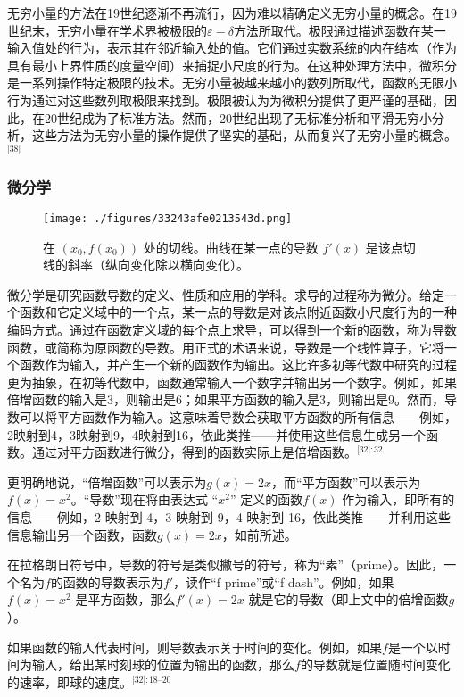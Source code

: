 无穷小量的方法在19世纪逐渐不再流行，因为难以精确定义无穷小量的概念。在19世纪末，无穷小量在学术界被极限的\(\varepsilon-\delta\)方法所取代。极限通过描述函数在某一输入值处的行为，表示其在邻近输入处的值。它们通过实数系统的内在结构（作为具有最小上界性质的度量空间）来捕捉小尺度的行为。在这种处理方法中，微积分是一系列操作特定极限的技术。无穷小量被越来越小的数列所取代，函数的无限小行为通过对这些数列取极限来找到。极限被认为为微积分提供了更严谨的基础，因此，在20世纪成为了标准方法。然而，20世纪出现了无标准分析和平滑无穷小分析，这些方法为无穷小量的操作提供了坚实的基础，从而复兴了无穷小量的概念。\(^\text{[38]}\)
\subsubsection{微分学}
\begin{figure}[ht]
\centering
\texttt{[image: ./figures/33243afe0213543d.png]}
\caption{在 \((x_0, f(x_0))\) 处的切线。曲线在某一点的导数 \(f'(x)\) 是该点切线的斜率（纵向变化除以横向变化）。} \label{fig_Calcul_7}
\end{figure}
微分学是研究函数导数的定义、性质和应用的学科。求导的过程称为微分。给定一个函数和它定义域中的一个点，某一点的导数是对该点附近函数小尺度行为的一种编码方式。通过在函数定义域的每个点上求导，可以得到一个新的函数，称为导数函数，或简称为原函数的导数。用正式的术语来说，导数是一个线性算子，它将一个函数作为输入，并产生一个新的函数作为输出。这比许多初等代数中研究的过程更为抽象，在初等代数中，函数通常输入一个数字并输出另一个数字。例如，如果倍增函数的输入是3，则输出是6；如果平方函数的输入是3，则输出是9。然而，导数可以将平方函数作为输入。这意味着导数会获取平方函数的所有信息——例如，2映射到4，3映射到9，4映射到16，依此类推——并使用这些信息生成另一个函数。通过对平方函数进行微分，得到的函数实际上是倍增函数。\(^\text{[32]: 32}\) 

更明确地说，“倍增函数”可以表示为\( g(x) = 2x \)，而“平方函数”可以表示为\( f(x) = x^2\)。“导数”现在将由表达式 “\(x^2\)” 定义的函数\( f(x) \) 作为输入，即所有的信息——例如，2 映射到 4，3 映射到 9，4 映射到 16，依此类推——并利用这些信息输出另一个函数，函数\( g(x) = 2x \)，如前所述。

在拉格朗日符号中，导数的符号是类似撇号的符号，称为“素”（prime）。因此，一个名为\( f \)的函数的导数表示为\( f' \)，读作“f prime”或“f dash”。例如，如果\( f(x) = x^2 \) 是平方函数，那么\( f'(x) = 2x \) 就是它的导数（即上文中的倍增函数\( g \)）。

如果函数的输入代表时间，则导数表示关于时间的变化。例如，如果\( f \)是一个以时间为输入，给出某时刻球的位置为输出的函数，那么\( f \)的导数就是位置随时间变化的速率，即球的速度。\(^\text{[32]: 18–20 }\) 


